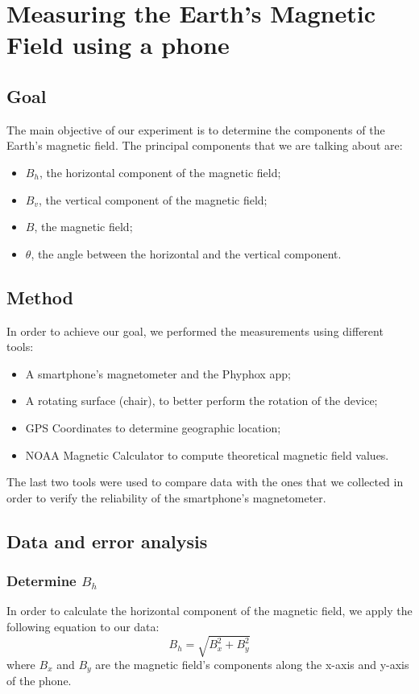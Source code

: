 \documentclass[notitlepage]{report}
\newcounter{theo}[section]\setcounter{theo}{0}
\numberwithin{equation}{section}
\theoremstyle{plain}
\theoremstyle{definition}
\theoremstyle{remark}
\begin{document}
\chapter{Measuring the Earth’s Magnetic Field using a phone}

\section{Goal}
The main objective of our experiment is to determine the components of the Earth’s magnetic field. The principal components that we are talking about are: 
\begin{itemize}
    \item $B_h$, the horizontal component of the magnetic field;
    \item $B_v$, the vertical component of the magnetic field;
    \item $B$, the magnetic field;
    \item $\theta$, the angle between the horizontal and the vertical component.
\end{itemize}

\section{Method}
In order to achieve our goal, we performed the measurements using different tools:
\begin{itemize}
    \item A smartphone’s magnetometer and the Phyphox app;
    \item A rotating surface (chair), to better perform the rotation of the device;
    \item GPS Coordinates to determine geographic location;
    \item NOAA Magnetic Calculator to compute theoretical magnetic field values.
\end{itemize}

The last two tools were used to compare data with the ones that we collected in order to verify the reliability of the smartphone’s magnetometer. 

\section{Data and error analysis}
\subsection{Determine $B_h$}
In order to calculate the horizontal component of the magnetic field, we apply the following equation to our data: 
\[ B_h = \sqrt{B_x^2 + B_y^2} \]
where $B_x$ and $B_y$ are the magnetic field’s components along the x-axis and y-axis of the phone.
\end{document}
